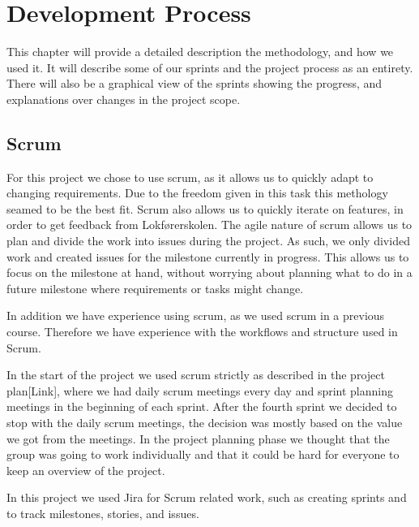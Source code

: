 \newpage
\section{Development Process}

This chapter will provide a detailed description the methodology, and how we used it. It will describe some of our sprints and the project process as an entirety. There will also be a graphical view of the sprints showing the progress, and explanations over changes in the project scope.


\subsection{Scrum}


For this project we chose to use scrum, as it allows us to quickly adapt to changing requirements. Due to the freedom given in this task this methology seamed to be the best fit. Scrum also allows us to quickly iterate on features, in order to get feedback from Lokførerskolen. 
The agile nature of scrum allows us to plan and divide the work into issues during the project. As such, we only divided work and created issues for the milestone currently in progress. This allows us to focus on the milestone at hand, without worrying about planning what to do in a future milestone where requirements or tasks might change.

In addition we have experience using scrum, as we used scrum in a previous course. Therefore we have experience with the workflows and structure used in Scrum. 

In the start of the project we used scrum strictly as described in the project plan[Link], where we had daily scrum meetings every day and sprint planning meetings in the beginning of each sprint. After the fourth sprint we decided to stop with the daily scrum meetings, the decision was mostly based on the value we got from the meetings. In the project planning phase we thought that the group was going to work individually and that it could be hard for everyone to keep an overview of the project. 

In this project we used Jira for Scrum related work, such as creating sprints and to track milestones, stories, and issues. 

